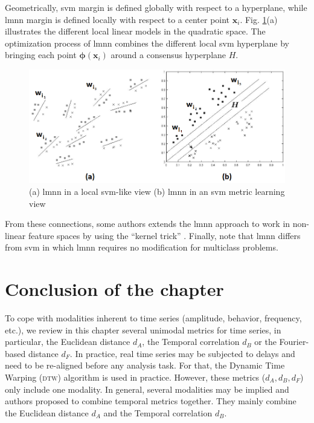 Geometrically, {\sc svm} margin is defined globally with respect to a hyperplane, while {\sc lmnn} margin is defined locally with respect to a center point $\textbf{x}_i$. Fig. \ref{fig:RelationSVM_LMNN}(a) illustrates the different local linear models in the quadratic space. The optimization process of {\sc lmnn} combines the different local {\sc svm} hyperplane by bringing each point $\boldsymbol{\phi }(\textbf{x}_i)$ around a consensus hyperplane $H$.

\begin{figure}[h!]
	\centering
	\includegraphics[width=0.9\linewidth]{images/RelationSVM_LMNN}
	\caption{(a) {\sc lmnn} in a local {\sc svm}-like view (b) {\sc lmnn} in an {\sc svm} metric learning view \cite{Do2012}}
	\label{fig:RelationSVM_LMNN}
\end{figure}

From these connections, some authors extends the {\sc lmnn} approach to work in non-linear feature spaces by using the “kernel trick” . Finally, note that {\sc lmnn} differs from {\sc svm} in which {\sc lmnn} requires no modification for multiclass problems.





\section{Conclusion of the chapter}
To cope with modalities inherent to time series (amplitude, behavior, frequency, etc.), we review in this chapter several unimodal metrics for time series, in particular, the Euclidean distance $d_A$, the Temporal correlation $d_B$ or the Fourier-based distance $d_F$. 
In practice, real time series may be subjected to delays and need to be re-aligned before any analysis task. For that, the Dynamic Time Warping (\textsc{dtw}) algorithm is used in practice. 
However, these metrics ($d_A, d_B, d_F$) only include one modality. In general, several modalities may be implied and authors proposed to combine temporal metrics together. They mainly combine the Euclidean distance $d_A$ and the Temporal correlation $d_B$. 


